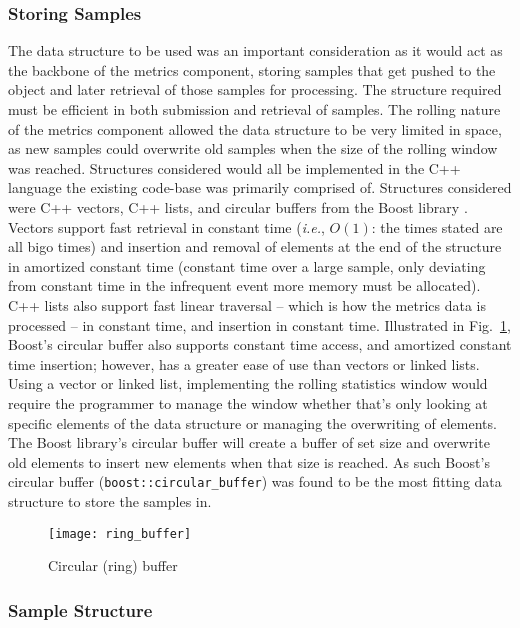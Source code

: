 \subsubsection{Storing Samples}

The data structure to be used was an important consideration as it would act as
the backbone of the metrics component, storing samples that get pushed to the
object and later retrieval of those samples for processing. The structure
required must be efficient in both submission and retrieval of samples. The
\gls{rolling} nature of the metrics component allowed the data structure to be very
limited in space, as new samples could overwrite old samples when the size of
the \gls{rolling} window was reached. Structures considered would all be
implemented in the C++ language the existing code-base was primarily
comprised of. Structures considered were C++ vectors, C++ lists, and circular
buffers from the Boost \gls{library} \cite{boost:circularbuffer}.  Vectors
support fast retrieval in constant time (\textit{i.e.}, $O(1)$: the times stated
are all \gls{bigo} times) and insertion and removal of elements at the end of
the structure in amortized constant time (constant time over a large sample,
only deviating from constant time in the infrequent event more memory must be
allocated). C++ lists also support fast linear traversal -- which is how the
metrics data is processed -- in constant time, and insertion in constant time.
Illustrated in Fig.~\ref{fig:ring_buffer}, Boost's circular buffer also supports
constant time access, and amortized constant time insertion; however, has a
greater ease of use than vectors or linked lists. Using a vector or linked list,
implementing the \gls{rolling} statistics window would require the programmer to
manage the window whether that's only looking at specific elements of the data
structure or managing the overwriting of elements. The Boost \gls{library}'s
circular buffer will create a buffer of set size and overwrite old elements to
insert new elements when that size is reached. As such Boost's circular buffer
(\lstinline|boost::circular_buffer|) was found to be the most fitting data
structure to store the samples in.

\begin{figure}
	\centering
	\texttt{[image: ring\_buffer]}
	\caption{Circular (ring) buffer}
	\label{fig:ring_buffer}
\end{figure}

\subsubsection{Sample Structure}

